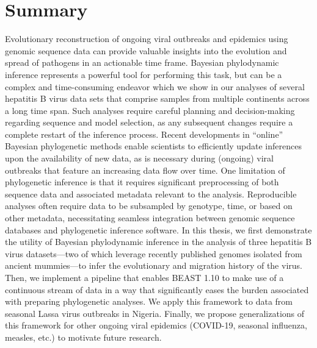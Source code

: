 \chapter{Summary}
\label{ch:summary}

Evolutionary reconstruction of ongoing viral outbreaks and epidemics using genomic sequence data can provide valuable insights into the evolution and spread of pathogens in an actionable time frame. %
Bayesian phylodynamic inference represents a powerful tool for performing this task, but can be a complex and time-consuming endeavor which we show in our analyses of several hepatitis B virus data sets that comprise samples from multiple continents across a long time span.
Such analyses require careful planning and decision-making regarding sequence and model selection, as any subsequent changes require a complete restart of the inference process.
Recent developments in ``online'' Bayesian phylogenetic methods enable scientists to efficiently update inferences upon the availability of new data, as is necessary during (ongoing) viral outbreaks that feature an increasing data flow over time.
One limitation of phylogenetic inference is that it requires significant preprocessing of both sequence data and associated metadata relevant to the analysis.
Reproducible analyses often require data to be subsampled by genotype, time, or based on other metadata, necessitating seamless integration between genomic sequence databases and phylogenetic inference software.
In this thesis, we first demonstrate the utility of Bayesian phylodynamic inference in the analysis of three hepatitis B virus datasets---two of which leverage recently published genomes isolated from ancient mummies---to infer the evolutionary and migration history of the virus.
Then, we implement a pipeline that enables BEAST 1.10 to make use of a continuous stream of data in a way that significantly eases the burden associated with preparing phylogenetic analyses.
We apply this framework to data from seasonal Lassa virus outbreaks in Nigeria.
Finally, we propose generalizations of this framework for other ongoing viral epidemics (COVID-19, seasonal influenza, measles, etc.) to motivate future research.


\cleardoublepage


